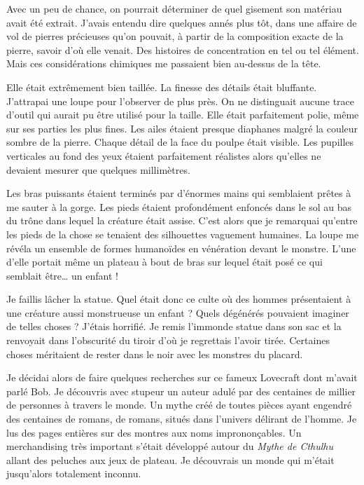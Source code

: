Avec un peu de chance, on pourrait déterminer de quel gisement son matériau avait été extrait. J'avais entendu dire 
quelques annés plus tôt, dans une affaire de vol de pierres précieuses qu'on pouvait, à partir de la composition 
exacte de la pierre, savoir d'où elle venait. Des histoires de concentration en tel ou tel élément. Mais ces 
considérations chimiques me passaient bien au-dessus de la tête.

Elle était extrêmement bien taillée. La finesse des détails était bluffante. J'attrapai une loupe pour l'observer de 
plus près. On ne distinguait aucune trace d'outil qui aurait pu être utilisé pour la taille. Elle était parfaitement 
polie, même sur ses parties les plus fines. Les ailes étaient presque diaphanes malgré la couleur sombre de la pierre. 
Chaque détail de la face du poulpe était visible. Les pupilles verticales au fond des yeux étaient parfaitement réalistes 
alors qu'elles ne devaient mesurer que quelques millimètres.

Les bras puissants étaient terminés par d'énormes mains qui semblaient prêtes à me sauter à la gorge. Les pieds étaient
profondément enfoncés dans le sol au bas du trône dans lequel la créature était assise. C'est alors que je remarquai
qu'entre les pieds de la chose se tenaient des silhouettes vaguement humaines. La loupe me révéla un ensemble de formes
humanoïdes en vénération devant le monstre. L'une d'elle portait même un plateau à bout de bras sur lequel était
posé ce qui semblait être\ldots{} un enfant !

Je faillis lâcher la statue. Quel était donc ce culte où des hommes présentaient à une créature aussi monstrueuse un
enfant ? Quels dégénérés pouvaient imaginer de telles choses ? J'étais horrifié. Je remis l'immonde statue dans son sac
et la renvoyait dans l'obscurité du tiroir d'où je regrettais l'avoir tirée. Certaines choses méritaient de rester
dans le noir avec les monstres du placard.

Je décidai alors de faire quelques recherches sur ce fameux Lovecraft dont m'avait parlé Bob. Je découvris avec stupeur
un auteur adulé par des centaines de millier de personnes à travers le monde. Un mythe créé de toutes pièces ayant
engendré des centaines de romans, de romans, situés dans l'univers délirant de l'homme. Je lus des pages entières sur
des montres aux noms imprononçables. Un merchandising très important s'était développé autour du \emph{Mythe de Cthulhu}
allant des peluches aux jeux de plateau. Je découvrais un monde qui m'était jusqu'alors totalement inconnu.

